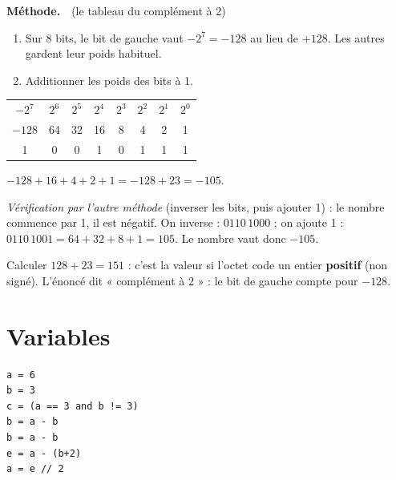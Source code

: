 \documentclass[addpoints, 11pt]{exam}
\newcommand{\methode}{\par\smallskip\noindent\textbf{Méthode.}\ }
\DeclareRobustCommand{\_}{\textunderscore\allowbreak}
\begin{document}
\begin{questions}
\methode\ (le tableau du complément à 2)
\begin{enumerate}
  \item Sur 8 bits, le bit de gauche vaut $-2^7 = -128$ au lieu de $+128$. Les autres gardent leur poids habituel.
  \item Additionner les poids des bits à 1.
\end{enumerate}
\begin{center}
\begin{tabular}{cccccccc}
$-2^7$ & $2^6$ & $2^5$ & $2^4$ & $2^3$ & $2^2$ & $2^1$ & $2^0$\\
$-128$ & 64 & 32 & 16 & 8 & 4 & 2 & 1\\ \hline
1 & 0 & 0 & 1 & 0 & 1 & 1 & 1\\
\end{tabular}
\end{center}
$-128 + 16 + 4 + 2 + 1 = -128 + 23 = -105$.

\textit{Vérification par l'autre méthode} (inverser les bits, puis ajouter 1) : le nombre commence par 1, il est négatif. On inverse : $0110\,1000$ ; on ajoute 1 : $0110\,1001 = 64 + 32 + 8 + 1 = 105$. Le nombre vaut donc $-105$.

\begin{erreur}
Calculer $128 + 23 = 151$ : c'est la valeur si l'octet code un entier \textbf{positif} (non signé). L'énoncé dit « complément à 2 » : le bit de gauche compte pour $-128$.
\end{erreur}

\section{Variables}

\begin{lstlisting}
a = 6
b = 3
c = (a == 3 and b != 3)
b = a - b
b = a - b
e = a - (b+2)
a = e // 2
\end{lstlisting}


\end{questions}
\end{document}
